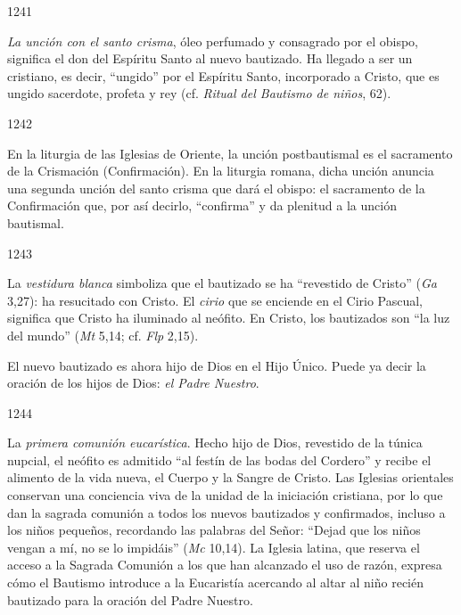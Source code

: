 			\begin{ccebody}\begin{ccenumber}1241\end{ccenumber} \textit{La unción con el santo crisma}, óleo perfumado y consagrado por el obispo, significa el don del Espíritu Santo al nuevo bautizado. Ha llegado a ser un cristiano, es decir, “ungido” por el Espíritu Santo, incorporado a Cristo, que es ungido sacerdote, profeta y rey (cf. \textit{Ritual del Bautismo de niños}, 62).\end{ccebody}
			
			\begin{ccebody}\begin{ccenumber}1242\end{ccenumber} En la liturgia de las Iglesias de Oriente, la unción postbautismal es el sacramento de la Crismación (Confirmación). En la liturgia romana, dicha unción anuncia una segunda unción del santo crisma que dará el obispo: el sacramento de la Confirmación que, por así decirlo, “confirma” y da plenitud a la unción bautismal.\end{ccebody}
			
			\begin{ccebody}\begin{ccenumber}1243\end{ccenumber} La \textit{vestidura blanca} simboliza que el bautizado se ha “revestido de Cristo” (\textit{Ga} 3,27): ha resucitado con Cristo. El \textit{cirio} que se enciende en el Cirio Pascual, significa que Cristo ha iluminado al neófito. En Cristo, los bautizados son “la luz del mundo” (\textit{Mt} 5,14; cf. \textit{Flp} 2,15).\end{ccebody}
			
			\begin{ccebody}El nuevo bautizado es ahora hijo de Dios en el Hijo Único. Puede ya decir la oración de los hijos de Dios: \textit{el Padre Nuestro}.\end{ccebody}
			
			\begin{ccebody}\begin{ccenumber}1244\end{ccenumber} La \textit{primera comunión eucarística}. Hecho hijo de Dios, revestido de la túnica nupcial, el neófito es admitido “al festín de las bodas del Cordero” y recibe el alimento de la vida nueva, el Cuerpo y la Sangre de Cristo. Las Iglesias orientales conservan una conciencia viva de la unidad de la iniciación cristiana, por lo que dan la sagrada comunión a todos los nuevos bautizados y confirmados, incluso a los niños pequeños, recordando las palabras del Señor: “Dejad que los niños vengan a mí, no se lo impidáis” (\textit{Mc} 10,14). La Iglesia latina, que reserva el acceso a la Sagrada Comunión a los que han alcanzado el uso de razón, expresa cómo el Bautismo introduce a la Eucaristía acercando al altar al niño recién bautizado para la oración del Padre Nuestro.\end{ccebody}
			
